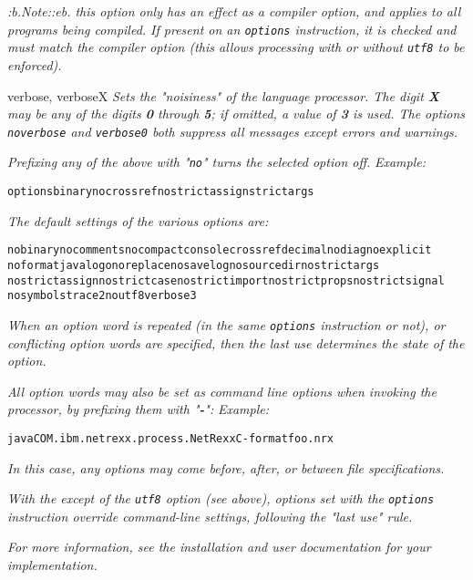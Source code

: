 \begin{description}
\emph{:b.Note::eb.
this option only has an effect as a compiler option, and applies to
all programs being compiled.  If present on an \texttt{options}
instruction, it is checked and must match the compiler option (this
allows processing with or without \texttt{utf8} to be
enforced).}
\item{verbose, verboseX}
\emph{Sets the "noisiness" of the language processor.
The digit \textbf{\emph{X}} may be any of the digits \textbf{0}
through \textbf{5}; if omitted, a value of \textbf{3} is used.
The options \texttt{noverbose} and \texttt{verbose0} both suppress all
messages except errors and warnings.}
\end{description}
 
\emph{Prefixing any of the above with "\texttt{no}" turns the selected
option off.}
 \emph{Example:}
\begin{alltt}
options binary nocrossref nostrictassign strictargs
\end{alltt}
 
\emph{The default settings of the various options are:}
\begin{alltt}
nobinary nocomments nocompact console crossref decimal nodiag noexplicit
noformat java logo noreplace nosavelog nosourcedir nostrictargs
nostrictassign nostrictcase nostrictimport nostrictprops nostrictsignal
nosymbols trace2 noutf8 verbose3
\end{alltt}
 
\emph{When an option word is repeated (in the same \texttt{options}
instruction or not), or conflicting option words are specified, then the
last use determines the state of the option.}
 
\emph{All option words may also be set as command line options when invoking
the processor, by prefixing them with "\textbf{-}":}
 \emph{Example:}
\begin{alltt}
java COM.ibm.netrexx.process.NetRexxC -format foo.nrx
\end{alltt}
\emph{In this case, any options may come before, after, or between
file specifications.}
 
\emph{With the except of the \texttt{utf8} option (see above),
options set with the \texttt{options} instruction override command-line
settings, following the "last use" rule.}
 
\emph{For more information, see the installation and user documentation for
your implementation.
}
